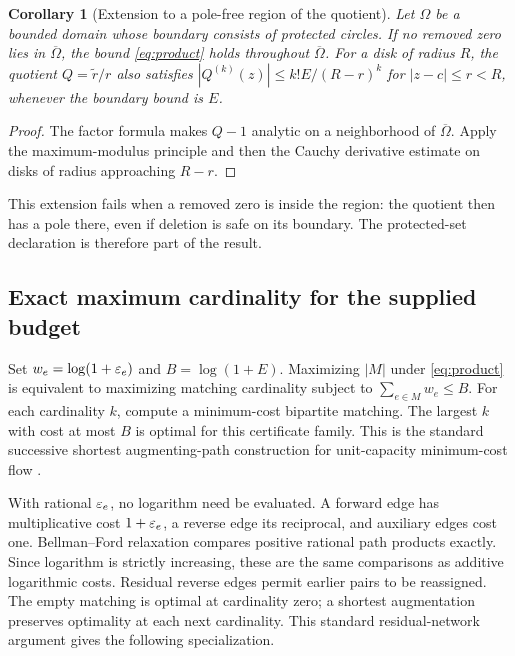\documentclass[11pt]{article}
\newtheorem{corollary}[theorem]{Corollary}
\theoremstyle{definition}\newtheorem{definition}[theorem]{Definition}
\begin{document}
\begin{corollary}[Extension to a pole-free region of the quotient]\label{cor:region}
Let $\Omega$ be a bounded domain whose boundary consists of protected circles. If no removed zero lies in $\overline\Omega$, the bound \eqref{eq:product} holds throughout $\overline\Omega$. For a disk of radius $R$, the quotient $Q=\widetilde r/r$ also satisfies $|Q^{(k)}(z)|\le k!E/(R-r)^k$ for $|z-c|\le r<R$, whenever the boundary bound is $E$.
\end{corollary}
\begin{proof}
The factor formula makes $Q-1$ analytic on a neighborhood of $\overline\Omega$. Apply the maximum-modulus principle and then the Cauchy derivative estimate on disks of radius approaching $R-r$.
\end{proof}

This extension fails when a removed zero is inside the region: the quotient then has a pole there, even if deletion is safe on its boundary. The protected-set declaration is therefore part of the result.

\subsection{Exact maximum cardinality for the supplied budget}
Set $w_e=\log(1+\varepsilon_e)$ and $B=\log(1+E)$. Maximizing $|M|$ under \eqref{eq:product} is equivalent to maximizing matching cardinality subject to $\sum_{e\in M}w_e\le B$. For each cardinality $k$, compute a minimum-cost bipartite matching. The largest $k$ with cost at most $B$ is optimal for this certificate family. This is the standard successive shortest augmenting-path construction for unit-capacity minimum-cost flow \cite{flows}.

With rational $\varepsilon_e$, no logarithm need be evaluated. A forward edge has multiplicative cost $1+\varepsilon_e$, a reverse edge its reciprocal, and auxiliary edges cost one. Bellman--Ford relaxation compares positive rational path products exactly. Since logarithm is strictly increasing, these are the same comparisons as additive logarithmic costs. Residual reverse edges permit earlier pairs to be reassigned. The empty matching is optimal at cardinality zero; a shortest augmentation preserves optimality at each next cardinality. This standard residual-network argument gives the following specialization.
\end{document}
